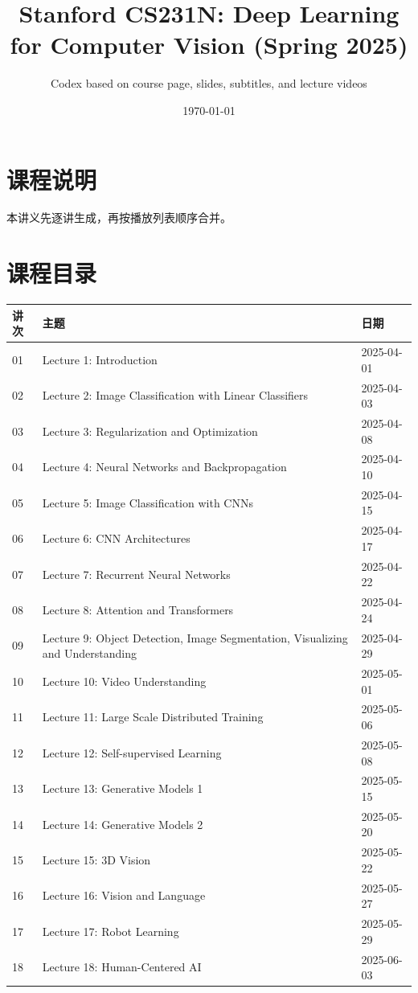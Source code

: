 \documentclass[a4paper]{article}
\title{Stanford CS231N: Deep Learning for Computer Vision (Spring 2025)}
\author{Codex based on course page, slides, subtitles, and lecture videos}
\date{\today}
\begin{document}
\maketitle
\tableofcontents
\newpage
\section*{课程说明}
本讲义先逐讲生成，再按播放列表顺序合并。
\section*{课程目录}
\begin{longtable}{p{}p{}p{}}
\textbf{讲次} & \textbf{主题} & \textbf{日期}\\
\hline
01 & Lecture 1: Introduction & 2025-04-01\\
02 & Lecture 2: Image Classification with Linear Classifiers & 2025-04-03\\
03 & Lecture 3: Regularization and Optimization & 2025-04-08\\
04 & Lecture 4: Neural Networks and Backpropagation & 2025-04-10\\
05 & Lecture 5: Image Classification with CNNs & 2025-04-15\\
06 & Lecture 6: CNN Architectures & 2025-04-17\\
07 & Lecture 7: Recurrent Neural Networks & 2025-04-22\\
08 & Lecture 8: Attention and Transformers & 2025-04-24\\
09 & Lecture 9: Object Detection, Image Segmentation, Visualizing and Understanding & 2025-04-29\\
10 & Lecture 10: Video Understanding & 2025-05-01\\
11 & Lecture 11: Large Scale Distributed Training & 2025-05-06\\
12 & Lecture 12: Self-supervised Learning & 2025-05-08\\
13 & Lecture 13:  Generative Models 1 & 2025-05-15\\
14 & Lecture 14:  Generative Models 2 & 2025-05-20\\
15 & Lecture 15: 3D Vision & 2025-05-22\\
16 & Lecture 16: Vision and Language & 2025-05-27\\
17 & Lecture 17: Robot Learning & 2025-05-29\\
18 & Lecture 18: Human-Centered AI & 2025-06-03\\
\end{longtable}
\end{document}
